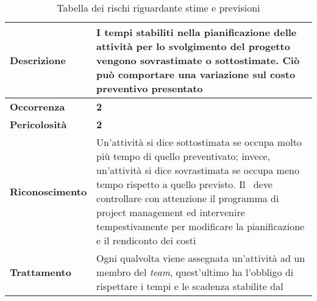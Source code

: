 \begin{table}[H]
	\begin{center}
		\begin{tabular}{|>{\centering\arraybackslash} m{3cm}  ||>{\centering\arraybackslash} m{10cm}|}
			\hline
			\textbf{Descrizione}	& I tempi stabiliti nella pianificazione delle attività per lo svolgimento del progetto vengono sovrastimate o sottostimate. Ciò può comportare una variazione sul costo preventivo presentato\\
			\hline
			\textbf{Occorrenza}	&	\textbf{2}	\\
			\hline
			\textbf{Pericolosità}	&	\textbf{2}	\\
			\hline
			\textbf{Riconoscimento}	&	Un’attività si dice sottostimata se occupa molto più tempo di quello preventivato; invece, un'attività si dice sovrastimata se occupa meno tempo rispetto a quello previsto. Il \textit{\RdP}\ deve controllare con attenzione il programma di project management ed intervenire tempestivamente per modificare la pianificazione e il rendiconto dei costi	\\
			\hline
			\textbf{Trattamento}	&	Ogni qualvolta viene assegnata un'attività ad un membro del \textit{team\ped{G}}, quest'ultimo ha l'obbligo di rispettare i tempi e le scadenza stabilite dal \textit{\RdP}	\\
			\hline
		\end{tabular}
		\caption{Tabella dei rischi riguardante stime e previsioni}
	\end{center}
\end{table}

